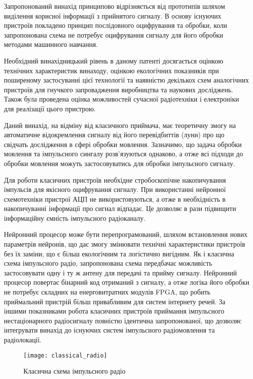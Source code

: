 Запропонований винахід принципово відрізняється від прототипів шляхом 
виділення корисної інформації з прийнятого сигналу. В основу існуючих 
пристроїв покладено принцип послідовного оцифрування та обробки, коли запропонована схема не потребує оцифрування сигналу для його обробки 
методами машинного навчання.

Необхідний винахідницький рівень в даному патенті досягається оцінкою 
технічних характеристик винаходу, оцінкою екологічних показників при 
поширеному застосуванні цієї технології та наявністю декількох схем 
аналогічних пристроїв для гнучкого запровадження виробництва  та наукових 
досліджень. Також  була проведена оцінка можливостей сучасної радіотехніки 
і електроніки для реалізації цього пристрою.

Даний винахід, на відміну від класичного приймача, має теоретичну змогу 
на автоматичне відокремлення сигналу від його перевідбиттів (луни) про що 
свідчать дослідження в сфері обробки мовлення. Зазначимо, що задача обробки 
мовлення та імпульсного сингалу розв’язуються однаково, а отже всі підходи 
до обробки мовлення можуть застосовуватись для обробки імпульсного сигналу. 

Для роботи класичних пристроїв необхідне стробоскопічне накопичування 
імпульсів для якісного оцифрування сигналу. При використанні нейронної 
схемотехніки пристрої АЦП не використовуються, а отже в необхідність в 
накопичуванні інформації про сигнал відпадає. Це дозволяє в рази підвищити 
інформаційну ємність імпульсного радіоканалу.

Нейронний процесор може бути перепрограмований, шляхом встановлення нових
параметрів нейронів, що дає змогу змінювати технічні характеристики 
пристроїв без їх заміни, що є більш екологічним та логістично вигідним.
Як і класична схема імпульсного радіо, запропонована схема передбачає 
можливість застосовувати одну і ту ж антену для передачі та прийму сигналу. 
Нейронний процесор повертає бінарний код отриманий з сигналу, а отже логіка 
його обробки не потребує складних на енерговитратних модулів FPGA, що 
робить приймальний пристрій більш привабливим для систем інтернету речей. 
За іншими показниками робота класичних пристроїв приймання імпульсного нестаціонарного радіосигналу повністю ідентична запропонованої, що 
дозволяє інтегрувати винахід до існуючих систем імпульсного 
радіомовлення та радіолокації.

\begin{figure}[htbp] \begin{center}
\texttt{[image: classical\_radio]}
\caption{Класична схема імпульсного радіо} \label{fig:emp_radio}
\end{center} \end{figure}

